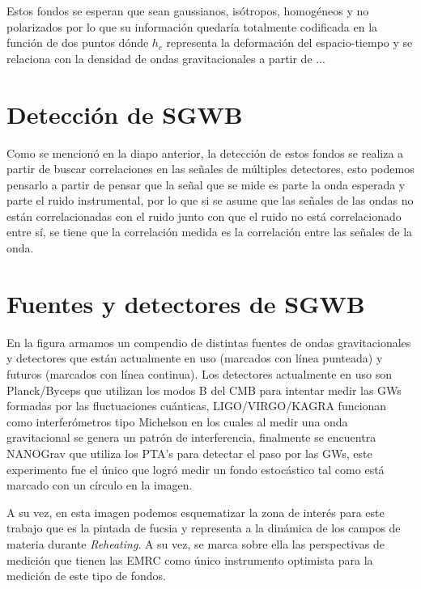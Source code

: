 \documentclass[letterpaper,12pt]{report}
\begin{document}
    Estos fondos se esperan que sean gaussianos, isótropos, homogéneos y no polarizados por lo que su información quedaría totalmente codificada en la función de dos puntos dónde $h_c$ representa la deformación del espacio-tiempo y se relaciona con la densidad de ondas gravitacionales a partir de ...
    
  \section{Detección de SGWB}
    Como se mencionó en la diapo anterior, la detección de estos fondos se realiza a partir de buscar correlaciones en las señales de múltiples detectores, esto podemos pensarlo a partir de pensar que la señal que se mide es parte la onda esperada y parte el ruido instrumental, por lo que si se asume que las señales de las ondas no están correlacionadas con el ruido junto con que el ruido no está correlacionado entre sí, se tiene que la correlación medida es la correlación entre las señales de la onda.

  \section{Fuentes y detectores de SGWB}
    En la figura armamos un compendio de distintas fuentes de ondas gravitacionales y detectores que están actualmente en uso (marcados con línea punteada) y futuros (marcados con línea continua). Los detectores actualmente en uso son Planck/Byceps que utilizan los modos B del CMB para intentar medir las GWs formadas por las fluctuaciones cuánticas, LIGO/VIRGO/KAGRA funcionan como interferómetros tipo Michelson en los cuales al medir una onda gravitacional se genera un patrón de interferencia, finalmente se encuentra NANOGrav que utiliza los PTA's para detectar el paso por las GWs, este experimento fue el único que logró medir un fondo estocástico tal como está marcado con un círculo en la imagen.

    A su vez, en esta imagen podemos esquematizar la zona de interés para este trabajo que es la pintada de fucsia y representa a la dinámica de los campos de materia durante \emph{Reheating}. A su vez, se marca sobre ella las perspectivas de medición que tienen las EMRC como único instrumento optimista para la medición de este tipo de fondos.
\end{document}
